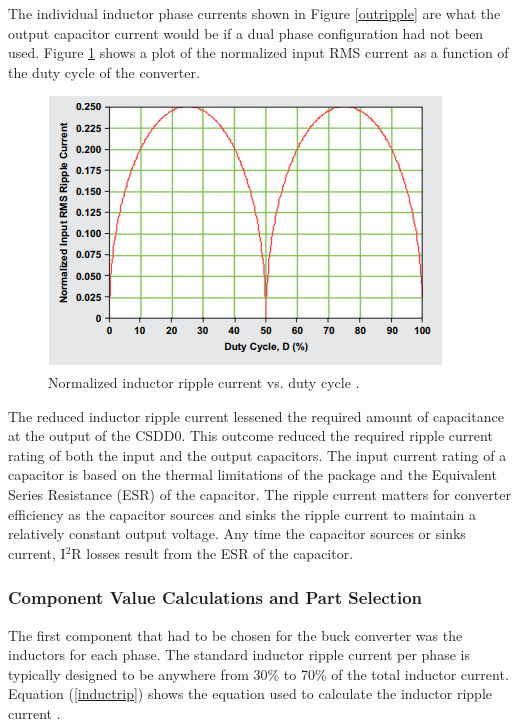 \documentclass[11pt]{article}
\begin{document}
    \noindent The individual inductor phase currents shown in Figure \ref{outripple} are what the output capacitor current would be if a dual phase configuration had not been used. Figure \ref{inripple} shows a plot of the normalized input RMS current as a function of the duty cycle of the converter. 
    
    \begin{figure}[H]
            \centering
            \includegraphics[width=0.5\linewidth]{inputripple.PNG}
            \caption{Normalized inductor ripple current vs. duty cycle \cite{david_baba_benefits_2012}.}
            \label{inripple}
        \end{figure}
    
    \noindent The reduced inductor ripple current lessened the required amount of capacitance at the output of the CSDD0. This outcome reduced the required ripple current rating of both the input and the output capacitors. The input current rating of a capacitor is based on the thermal limitations of the package and the Equivalent Series Resistance (ESR) of the capacitor. The ripple current matters for converter efficiency as the capacitor sources and sinks the ripple current to maintain a relatively constant output voltage. Any time the capacitor sources or sinks current, I$^2$R losses result from the ESR of the capacitor. 
    
    \subsubsection{Component Value Calculations and Part Selection}
    \noindent The first component that had to be chosen for the buck converter was the inductors for each phase.
    The standard inductor ripple current per phase is typically designed to be anywhere from 30\% to 70\% of the total inductor current. Equation (\ref{inductrip}) shows the equation used to calculate the inductor ripple current \cite{linear_technology_ltc3892:_nodate}.
    
\end{document}
